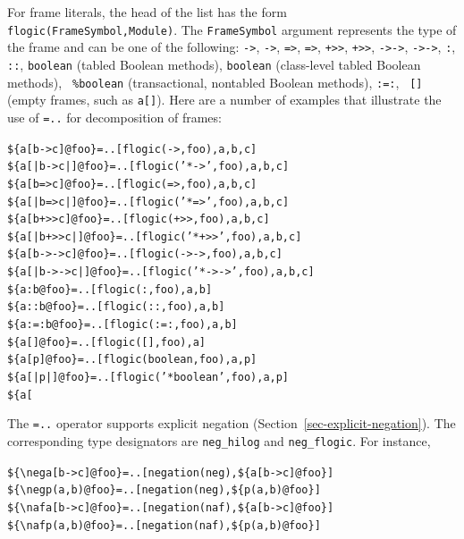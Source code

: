 \documentclass[11pt]{article}
\newcommand{\bs}{\textbackslash}
\newcommand{\RULELOGNAF}{{\texttt{{\bs}naf}}\xspace}
\newcommand{\RULELOGNEG}{{\texttt{{\bs}neg}}\xspace}
\begin{document}
For frame literals, the head of the list has the form
{\tt flogic(FrameSymbol,Module)}. The {\tt FrameSymbol} argument
represents the type of the frame and can be one of the following:
{\tt ->}, {\tt *->}, {\tt =>}, {\tt *=>}, {\tt +>{}>}, {\tt *+>{}>}, {\tt ->->},
{\tt *->->}, {\tt :}, {\tt ::}, {\tt boolean} (tabled Boolean methods),
{\tt *boolean} (class-level tabled Boolean methods), {\tt 
  \%boolean} (transactional, nontabled Boolean methods), {\tt :=:}, {\tt
  []} (empty frames, such as {\tt a[]}). Here are a number of examples
that illustrate the use of {\tt =..} for decomposition of frames:
\begin{alltt}
    \$\{a[b->c]@foo\} =.. [flogic(->,foo), a, b, c]
    \$\{a[|b->c|]@foo\} =.. [flogic('*->',foo), a, b, c]
    \$\{a[b=>c]@foo\} =.. [flogic(=>,foo), a, b, c]
    \$\{a[|b=>c|]@foo\} =.. [flogic('*=>',foo), a, b, c]
    \$\{a[b+>{}>c]@foo\} =.. [flogic(+>{}>,foo), a, b, c]
    \$\{a[|b+>{}>c|]@foo\} =.. [flogic('*+>{}>',foo), a, b, c]
    \$\{a[b->->c]@foo\} =.. [flogic(->->,foo), a, b, c]
    \$\{a[|b->->c|]@foo\} =.. [flogic('*->->',foo), a, b, c]
    \$\{a:b@foo\} =.. [flogic(:,foo), a, b]
    \$\{a::b@foo\} =.. [flogic(::,foo), a, b]
    \$\{a:=:b@foo\} =.. [flogic(:=:,foo), a, b]
    \$\{a[]@foo\} =.. [flogic([],foo), a]
    \$\{a[p]@foo\} =.. [flogic(boolean,foo), a, p]
    \$\{a[|p|]@foo\} =.. [flogic('*boolean',foo), a, p]
    \$\{a[%
\end{alltt}
The {\tt =..} operator supports explicit negation
(Section~\ref{sec-explicit-negation}). The corresponding 
type designators are {\tt neg\_hilog} and {\tt neg\_flogic}. For instance,
\begin{alltt}
     \$\{\RULELOGNEG a[b->c]@foo\} =.. [negation(neg), \$\{a[b->c]@foo\}]
     \$\{\RULELOGNEG p(a,b)@foo\} =.. [negation(neg), \$\{p(a,b)@foo\}]
     \$\{\RULELOGNAF a[b->c]@foo\} =.. [negation(naf), \$\{a[b->c]@foo\}]
     \$\{\RULELOGNAF p(a,b)@foo\} =.. [negation(naf), \$\{p(a,b)@foo\}]
\end{alltt}
\end{document}

